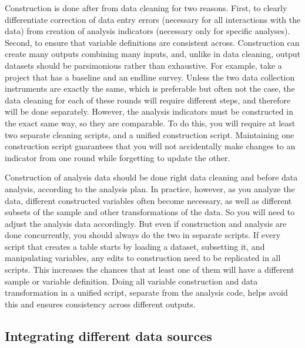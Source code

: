 Construction is done after from data cleaning for two reasons.
First, to clearly differentiate correction of data entry errors
(necessary for all interactions with the data)
from creation of analysis indicators (necessary only for specific analyses).
Second, to ensure that variable definitions are consistent across.
Construction can create many outputs combining many inputs,
and, unlike in data cleaning, output datasets should be parsimonious rather than exhaustive.
For example, take a project that has a baseline and an endline survey.
Unless the two data collection instruments are exactly the same,
which is preferable but often not the case,
the data cleaning for each of these rounds will require different steps,
and therefore will be done separately.
However, the analysis indicators must be constructed in the exact same way, 
so they are comparable.
To do this, you will require at least two separate cleaning scripts,
and a unified construction script.
Maintaining one construction script guarantees that you will not
accidentally make changes to an indicator from one round
while forgetting to update the other.

Construction of analysis data should be done right 
data cleaning and before data analysis,
according to the analysis plan.
In practice, however, as you analyze the data,
different constructed variables often become necessary,
as well as different subsets of the sample
and other transformations of the data.
So you will need to adjust the analysis data accordingly.
But even if construction and analysis are done concurrently,
you should always do the two in separate scripts.
If every script that creates a table starts by loading a dataset,
subsetting it, and manipulating variables,
any edits to construction need to be replicated in all scripts.
This increases the chances that at least one of them will have a different sample or variable definition.
Doing all variable construction and data transformation
in a unified script, separate from the analysis code, helps
avoid this and ensures consistency across different outputs.

\subsection{Integrating different data sources}

